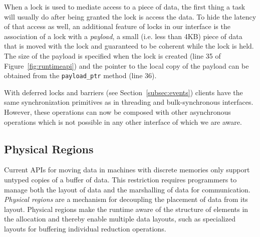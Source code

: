 When a lock is used to mediate access to a piece of data, the first thing a task will usually
do after being granted the lock is access the data.  To hide the latency of that
access as well, an additional feature of locks in our interface is the association of a lock with a
{\em payload}, a small (i.e. less than 4KB) 
piece of data that is moved with the lock and guaranteed to be coherent while 
the lock is held.  The size of the payload is specified when the lock is created (line 35 of Figure~\ref{fig:runtimeapi}) and
the pointer to the local copy of the payload can be obtained from the {\tt payload\_ptr} method
(line 36).

With deferred locks and barriers (see Section~\ref{subsec:events}) clients 
have the same synchronization primitives as
in threading and bulk-synchronous interfaces.  However, these operations can now 
be composed with other asynchronous operations which is not possible in any other interface
of which we are aware.



\subsection{Physical Regions}
\label{subsec:phyreg}
Current APIs for moving data in machines with discrete memories only support untyped
copies of a buffer of data.  This restriction requires programmers to manage both the layout of
data and the marshalling of data for communication.  {\em Physical regions} are a
mechanism for decoupling the placement of data from its layout.  Physical regions make
the runtime aware of the structure of elements in the allocation and thereby enable multiple data
layouts, such as specialized layouts for buffering individual reduction operations.

